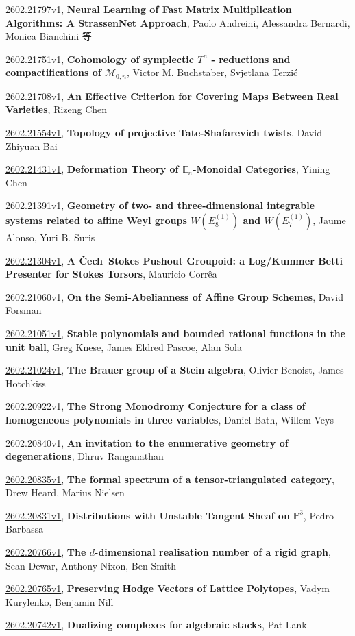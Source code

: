 \documentclass[9pt, a4paper]{article}
\theoremstyle{plain}
\theoremstyle{definition}
\theoremstyle{remark}
\newcommand{\arxiv}[3]{\href{https://arxiv.org/abs/#1}{#1}, \textbf{\textcolor{arxivblue}{#2}}, #3}
\begin{document}
\arxiv{2602.21797v1}{Neural Learning of Fast Matrix Multiplication Algorithms: A StrassenNet Approach}{Paolo Andreini, Alessandra Bernardi, Monica Bianchini 等}

\arxiv{2602.21751v1}{Cohomology of symplectic $T^n$ - reductions and compactifications of $\mathcal{M}_{0, n}$}{Victor M. Buchstaber, Svjetlana Terzić}

\arxiv{2602.21708v1}{An Effective Criterion for Covering Maps Between Real Varieties}{Rizeng Chen}

\arxiv{2602.21554v1}{Topology of projective Tate-Shafarevich twists}{David Zhiyuan Bai}

\arxiv{2602.21431v1}{Deformation Theory of $\mathbb{E}_n$-Monoidal Categories}{Yining Chen}

\arxiv{2602.21391v1}{Geometry of two- and three-dimensional integrable systems related to affine Weyl groups $W(E_8^{(1)})$ and $W(E_7^{(1)})$}{Jaume Alonso, Yuri B. Suris}

\arxiv{2602.21304v1}{A Čech--Stokes Pushout Groupoid: a Log/Kummer Betti Presenter for Stokes Torsors}{Mauricio Corrêa}

\arxiv{2602.21060v1}{On the Semi-Abelianness of Affine Group Schemes}{David Forsman}

\arxiv{2602.21051v1}{Stable polynomials and bounded rational functions in the unit ball}{Greg Knese, James Eldred Pascoe, Alan Sola}

\arxiv{2602.21024v1}{The Brauer group of a Stein algebra}{Olivier Benoist, James Hotchkiss}

\arxiv{2602.20922v1}{The Strong Monodromy Conjecture for a class of homogeneous polynomials in three variables}{Daniel Bath, Willem Veys}

\arxiv{2602.20840v1}{An invitation to the enumerative geometry of degenerations}{Dhruv Ranganathan}

\arxiv{2602.20835v1}{The formal spectrum of a tensor-triangulated category}{Drew Heard, Marius Nielsen}

\arxiv{2602.20831v1}{Distributions with Unstable Tangent Sheaf on $\mathbb{P}^3$}{Pedro Barbassa}

\arxiv{2602.20766v1}{The $d$-dimensional realisation number of a rigid graph}{Sean Dewar, Anthony Nixon, Ben Smith}

\arxiv{2602.20765v1}{Preserving Hodge Vectors of Lattice Polytopes}{Vadym Kurylenko, Benjamin Nill}

\arxiv{2602.20742v1}{Dualizing complexes for algebraic stacks}{Pat Lank}
\end{document}
